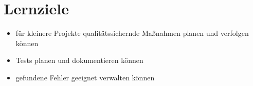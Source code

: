 \section{Lernziele}

\begin{itemize}
    \item für kleinere Projekte qualitätssichernde Maßnahmen planen und verfolgen können
    \item Tests planen und dokumentieren können
    \item gefundene Fehler geeignet verwalten können
\end{itemize}
